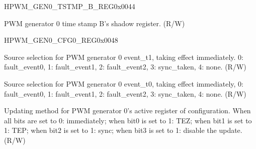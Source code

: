 \begin{register}{H}{PWM\_GEN0\_TSTMP\_B\_REG}{0x0044}\label{regdesc:PWMGEN0TSTMPBREG}
%
%
\regnewline%
\begin{regdesc}\begin{reglist}
\item [PWM\_GEN0\_B]PWM generator 0 time stamp B's shadow register. (R/W)
\end{reglist}\end{regdesc}
\end{register}


\begin{register}{H}{PWM\_GEN0\_CFG0\_REG}{0x0048}\label{regdesc:PWMGEN0CFG0REG}
%
%
%
%
\regnewline%
\begin{regdesc}\begin{reglist}
\item [PWM\_GEN0\_T1\_SEL]Source selection for PWM generator 0 event\_t1, taking effect immediately. 0: fault\_event0, 1: fault\_event1, 2: fault\_event2, 3: sync\_taken, 4: none. (R/W)
\item [PWM\_GEN0\_T0\_SEL]Source selection for PWM generator 0 event\_t0, taking effect immediately, 0: fault\_event0, 1: fault\_event1, 2: fault\_event2, 3: sync\_taken, 4: none. (R/W)
\item [PWM\_GEN0\_CFG\_UPMETHOD]Updating method for PWM generator 0's active register of configuration. When all bits are set to 0: immediately; when bit0 is set to 1: TEZ; when bit1 is set to 1: TEP; when bit2 is set to 1: sync; when bit3 is set to 1: disable the update. (R/W)
\end{reglist}\end{regdesc}
\end{register}


